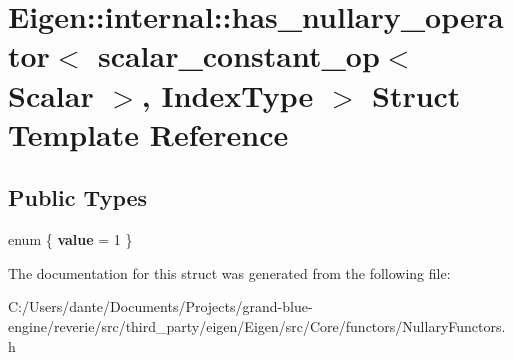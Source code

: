 \hypertarget{struct_eigen_1_1internal_1_1has__nullary__operator_3_01scalar__constant__op_3_01_scalar_01_4_00_01_index_type_01_4}{}\section{Eigen\+::internal\+::has\+\_\+nullary\+\_\+operator$<$ scalar\+\_\+constant\+\_\+op$<$ Scalar $>$, Index\+Type $>$ Struct Template Reference}
\label{struct_eigen_1_1internal_1_1has__nullary__operator_3_01scalar__constant__op_3_01_scalar_01_4_00_01_index_type_01_4}
\subsection*{Public Types}
\begin{DoxyCompactItemize}
\item 
\mbox{\label{struct_eigen_1_1internal_1_1has__nullary__operator_3_01scalar__constant__op_3_01_scalar_01_4_00_01_index_type_01_4_a0b1407e4bc985f19db152289a3133391}} 
enum \{ {\bfseries value} = 1
 \}
\end{DoxyCompactItemize}


The documentation for this struct was generated from the following file\+:\begin{DoxyCompactItemize}
\item 
C\+:/\+Users/dante/\+Documents/\+Projects/grand-\/blue-\/engine/reverie/src/third\+\_\+party/eigen/\+Eigen/src/\+Core/functors/Nullary\+Functors.\+h\end{DoxyCompactItemize}
